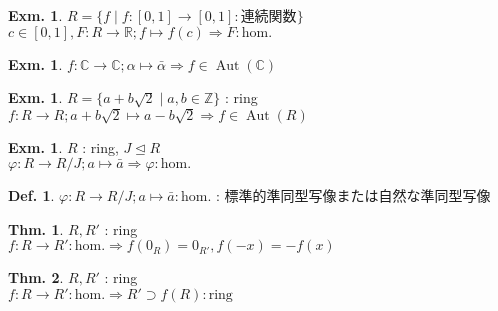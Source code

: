 \documentclass[uplatex,dvipdfmx,9pt]{beamer}
\newcommand{\Aut}[1]{\operatorname{Aut}(#1)}
\newcommand{\ideal}{\trianglelefteq}
\renewcommand{\hom}{\text{hom.}} %
\newcommand{\Z}{\mathbb{Z}}
\newcommand{\R}{\mathbb{R}}
\newcommand{\C}{\mathbb{C}}
\newcounter{textExmCount}
\theoremstyle{definition} %
\newtheorem{defn}{Def.}[subsection] %
\newtheorem{thm}{Thm.}[subsection] %
\theoremstyle{example}
\newtheorem{exmText}[textExmCount]{Exm.}
\begin{document}
\begin{frame}

  \begin{exmText}
    $R = \{f \mid f\colon [0, 1] \to [0, 1] : \text{連続関数}\}$ \\
    $c \in [0, 1], F\colon R \to \R ; f \mapsto f(c) \Rightarrow F : \hom$
  \end{exmText}

  \begin{exmText}
    $f\colon \C \to \C ; \alpha \mapsto \bar{\alpha} \Rightarrow f \in \Aut{\C}$
  \end{exmText}

  \begin{exmText}
    $R = \{a + b\sqrt{2} \mid a, b \in \Z\}$ : ring \\
    $f\colon R \to R ; a + b\sqrt{2} \mapsto a - b\sqrt{2} \Rightarrow f \in \Aut{R}$
  \end{exmText}

\end{frame}

\begin{frame}

  \begin{exmText}
    $R$ : ring, $J \ideal R$ \\
    $\varphi \colon R \to R/J ; a \mapsto \bar{a} \Rightarrow \varphi : \hom$
  \end{exmText}

  \begin{defn}
    $\varphi \colon R \to R/J ; a \mapsto \bar{a} : \hom$ : \alert{標準的準同型写像}または\alert{自然な準同型写像}
  \end{defn}

  \begin{thm}
    $R, R'$ : ring \\
    $f\colon R \to R' : \hom \Rightarrow f(0_R) = 0_{R'}, f(-x) = -f(x)$
  \end{thm}

  \begin{thm}
    $R, R'$ : ring \\
    $f\colon R \to R' : \hom \Rightarrow R' \supset f(R) : \text{ring}$
  \end{thm}

\end{frame}
\end{document}
